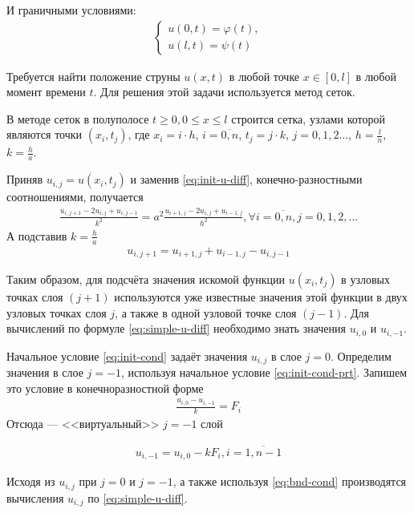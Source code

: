 И граничными условиями:
\begin{align}\label{eq:bnd-cond}
	\begin{cases}
		u(0,t) = \varphi(t), \\
		u(l,t) = \psi(t)
	\end{cases}
\end{align}

Требуется найти положение струны \(u(x,t)\) в любой точке \(x \in [0,l]\)  в любой момент времени \(t\). Для решения этой задачи используется метод сеток.

В методе сеток в полуполосе \(t \geq 0, 0 \leq x \leq l\) строится сетка, узлами которой являются точки \((x_i, t_j)\), где \(x_i = i \cdot h\), \(i = \overline{0,n}\), \(t_j=j\cdot k\), \(j = 0,1,2\dots\), \(h = \frac{l}{n}\), \(k = \frac{h}{a}\).

Приняв \(u_{i,j} = u(x_i,t_j)\) и заменив \cref{eq:init-u-diff}, конечно-разностными соотношениями, получается
\begin{align}
	\frac{u_{i,j+1} - 2 u_{i,j} + u_{i,j-1}}{k^2} = a^2 \frac{u_{i+1,j} - 2 u_{i,j} + u_{i - 1,j}}{h^2}, \forall i = \overline{0,n}, j = 0,1,2,\dots
\end{align}
А подставив \(k = \frac{h}{a}\)
\begin{align}\label{eq:simple-u-diff}
	u_{i,j+1} = u_{i+1,j} + u_{i - 1,j} - u_{i,j - 1}
\end{align}

Таким образом, для подсчёта значения искомой функции \(u(x_i, t_j)\) в узловых точках слоя \((j + 1)\) используются уже известные значения этой функции в двух узловых точках слоя \(j\), а также  в одной узловой точке слоя \((j - 1)\). Для вычислений по формуле \cref{eq:simple-u-diff} необходимо знать значения \(u_{i,0}\) и \(u_{i,-1}\).

Начальное условие \cref{eq:init-cond} задаёт значения \(u_{i,j}\) в слое \(j = 0\). Определим значения в слое \(j = -1\), используя начальное условие \cref{eq:init-cond-prt}. Запишем это условие в конечноразностной форме
\begin{align}
	\frac{u_{i,0} - u_{i,-1}}{k} = F_i
\end{align}
Отсюда --- <<виртуальный>> \(j=-1\) слой

\begin{align}
	u_{i,-1} = u_{i,0} - k F_i, i = \overline{1,n-1}
\end{align}

Исходя из \(u_{i,j}\) при \(j = 0\) и \(j = -1\), а также используя \cref{eq:bnd-cond} производятся вычисления \(u_{i,j}\) по \cref{eq:simple-u-diff}.

